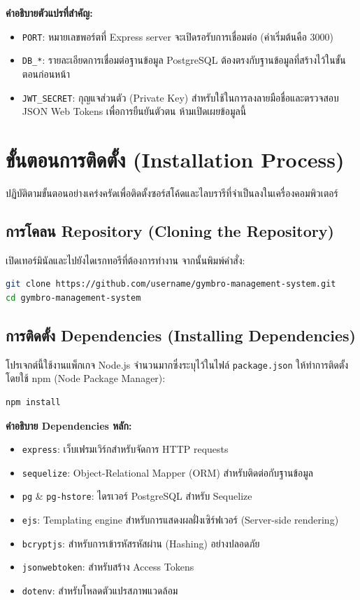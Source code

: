 \textbf{คำอธิบายตัวแปรที่สำคัญ:}
\begin{itemize}
    \item \texttt{PORT}: หมายเลขพอร์ตที่ Express server จะเปิดรอรับการเชื่อมต่อ (ค่าเริ่มต้นคือ 3000)
    \item \texttt{DB\_*}: รายละเอียดการเชื่อมต่อฐานข้อมูล PostgreSQL ต้องตรงกับฐานข้อมูลที่สร้างไว้ในขั้นตอนก่อนหน้า
    \item \texttt{JWT\_SECRET}: กุญแจส่วนตัว (Private Key) สำหรับใช้ในการลงลายมือชื่อและตรวจสอบ JSON Web Tokens เพื่อการยืนยันตัวตน ห้ามเปิดเผยข้อมูลนี้
\end{itemize}

\section{ขั้นตอนการติดตั้ง (Installation Process)}
ปฏิบัติตามขั้นตอนอย่างเคร่งครัดเพื่อติดตั้งซอร์สโค้ดและไลบรารีที่จำเป็นลงในเครื่องคอมพิวเตอร์

\subsection{การโคลน Repository (Cloning the Repository)}
เปิดเทอร์มินัลและไปยังไดเรกทอรีที่ต้องการทำงาน จากนั้นพิมพ์คำสั่ง:
\begin{lstlisting}[language=bash, frame=single]
git clone https://github.com/username/gymbro-management-system.git
cd gymbro-management-system
\end{lstlisting}

\subsection{การติดตั้ง Dependencies (Installing Dependencies)}
โปรเจกต์นี้ใช้งานแพ็กเกจ Node.js จำนวนมากซึ่งระบุไว้ในไฟล์ \texttt{package.json} ให้ทำการติดตั้งโดยใช้ npm (Node Package Manager):
\begin{lstlisting}[language=bash, frame=single]
npm install
\end{lstlisting}

\textbf{คำอธิบาย Dependencies หลัก:}
\begin{itemize}
    \item \texttt{express}: เว็บเฟรมเวิร์กสำหรับจัดการ HTTP requests
    \item \texttt{sequelize}: Object-Relational Mapper (ORM) สำหรับติดต่อกับฐานข้อมูล
    \item \texttt{pg} \& \texttt{pg-hstore}: ไดรเวอร์ PostgreSQL สำหรับ Sequelize
    \item \texttt{ejs}: Templating engine สำหรับการแสดงผลฝั่งเซิร์ฟเวอร์ (Server-side rendering)
    \item \texttt{bcryptjs}: สำหรับการเข้ารหัสรหัสผ่าน (Hashing) อย่างปลอดภัย
    \item \texttt{jsonwebtoken}: สำหรับสร้าง Access Tokens
    \item \texttt{dotenv}: สำหรับโหลดตัวแปรสภาพแวดล้อม
\end{itemize}

